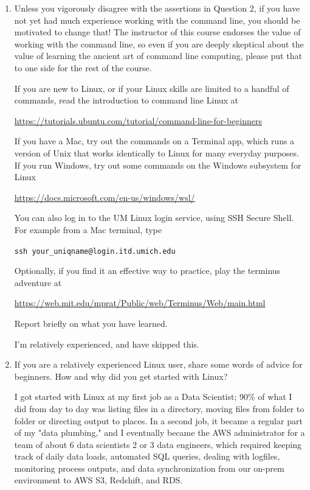 \documentclass[12pt]{article}
\begin{document}
\begin{enumerate}
Arguably, a wider and more inclusive view of Data science would include more Windows users, but the vast majority of the DS ecosystem is built around Unix commands.

\item  Unless you vigorously disagree with the assertions in Question 2, if you have not yet had much experience working with the command line, you should be motivated to change that! The instructor of this course endorses the value of working with the command line, so even if you are deeply skeptical about the value of learning the ancient art of command line computing, please put that to one side for the rest of the course.

If you are new to Linux, or if your Linux skills are limited to a handful of commands, read the introduction to command line Linux at
  
\url{https://tutorials.ubuntu.com/tutorial/command-line-for-beginners}

If you have a Mac, try out the commands on a Terminal app, which runs a version of Unix that works identically to Linux for many everyday purposes. If you run Windows, try out some commands on the Windows subsystem for Linux

\url{https://docs.microsoft.com/en-us/windows/wsl/}

You can also log in to the UM Linux login service, using SSH Secure Shell. For example from a Mac terminal, type

\texttt{ssh your\_uniqname@login.itd.umich.edu}

Optionally, if you find it an effective way to practice, play the terminus adventure at

\url{https://web.mit.edu/mprat/Public/web/Terminus/Web/main.html}

Report briefly on what you have learned.

I'm relatively experienced, and have skipped this.

\item If you are a relatively experienced Linux user, share some words of advice for beginners. How and why did you get started with Linux?  

I got started with Linux at my first job as a Data Scientist; 90\% of what I did from day to day was listing files in a directory, moving files from folder to folder or directing output to places. In a second job, it became a regular part of my "data plumbing," and I eventually became the AWS administrator for a team of about 6 data scientists 2 or 3 data engineers, which required keeping track of daily data loads, automated SQL queries, dealing with logfiles, monitoring process outputs, and data synchronization from our on-prem environment to AWS S3, Redshift, and RDS.


\end{enumerate}
\end{document}
